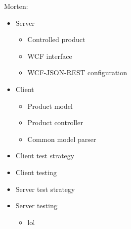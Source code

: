 Morten: 
\begin{itemize}
	\item Server
	\begin{itemize}
		\item Controlled product
		\item WCF interface
		\item WCF-JSON-REST configuration
	\end{itemize}
	\item Client
	\begin{itemize}
		\item Product model
		\item Product controller
		\item Common model
		\Json parser
	\end{itemize}
	\item Client test strategy
	\item Client testing
	\item Server test strategy
	\item Server testing
	\begin{itemize}
		\item lol
	\end{itemize}
\end{itemize}